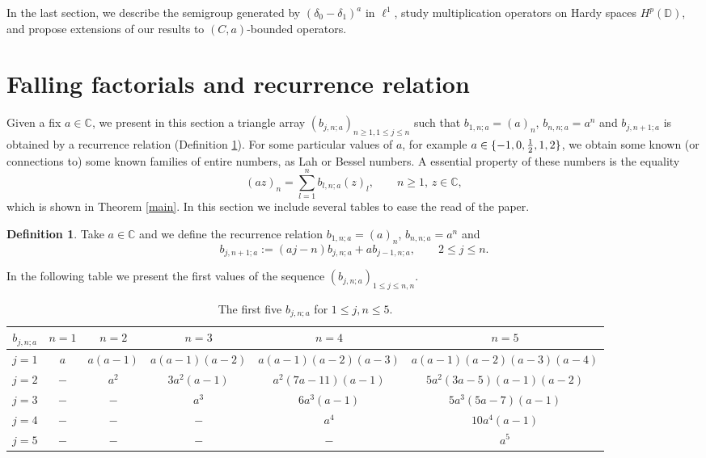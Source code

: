 \documentclass[a4paper,12pt]{amsart}
\def\CC{\mathbb C}
\def\CC{\mathbb C}
\def\DD{\mathbb D}
\theoremstyle{definition}
\newtheorem{definition}[thm]{Definition}
\theoremstyle{remark}
\begin{document}
In the last section, we describe the semigroup generated by $(\delta_0-\delta_1)^a$ in $\ell^1$, study multiplication operators on Hardy spaces $H^p(\DD)$, and propose extensions of our results to $(C,a)$-bounded operators.



\section{Falling factorials and recurrence relation}


Given a fix $a\in \CC$, we present in this section a triangle array $(b_{j,n;a})_{n\ge 1, 1\le j\le n}$ such that
$b_{1,n;a}= (a)_n$, $b_{n, n;a}=a^n$ and $b_{j,n+1;a}$ is obtained by a recurrence relation (Definition \ref{intro}). For some particular values of $a$, for example $a\in\{-1,0,{1\over 2},1,2\}$, we obtain some known (or connections to) some known families of entire numbers, as Lah or Bessel numbers. A essential property of these numbers is the equality
$$
(az)_n= \sum_{l=1}^n b_{l,n;a}(z)_l, \qquad n\ge 1, \, z\in \CC,
$$
which is shown in Theorem \ref{main}. In this section we include several tables to ease the read of the paper.

\begin{definition}\label{intro} Take $a\in \CC$ and we define the recurrence relation  $b_{1,n;a}= (a)_n$, $b_{n, n;a}=a^n$ and
$$
b_{j,n+1;a}:= (a j-n)b_{j,n;a}+ab_{j-1,n;a}, \qquad 2\le j\le n.
$$
\end{definition}




In the following table we present the first values of the sequence $(b_{j,n;a})_{1\le j \le n,n}$.

\begin{table}[h]\label{Tableb}\small{
\centering
\begin{tabular}{c|ccccc}
$b_{j,n;a}$ & $n=1$ & $n=2$ & $n=3$ & $n=4$ & $n=5$ \\ \hline
$j=1$ & $a$ & $a(a-1)$ & $a(a-1)(a-2)$ & $a(a-1)(a-2)(a-3)$ & $a(a-1)(a-2)(a-3)(a-4)$\\ \hline
$j=2$ &$-$ &$a^2$ &$3a^2(a-1)$ & $a^2(7a-11)(a-1)$ &$5a^2(3a-5)(a-1)(a-2)$\\  \hline
$j=3$ &$-$ &$-$ &$a^3$ &$6a^3(a-1)$ & $5a^3(5a-7)(a-1)$ \\ \hline
$j=4$ &$-$ &$-$ &$-$ &$a^4$ &$10a^4(a-1)$ \\ \hline
$j=5$ &$-$ &$-$ &$-$ &$-$ &$a^5$\\
\end{tabular}
\vspace{2pt}
\caption{\small The first five $b_{j,n;a}$ for $1\le j,n\le 5.$}}
\end{table}
\end{document}
